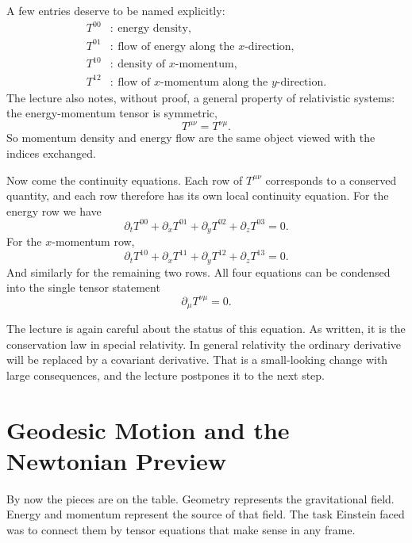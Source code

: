 A few entries deserve to be named explicitly:
\begin{align}
T^{00} &:\ \text{energy density}, \\
T^{01} &:\ \text{flow of energy along the }x\text{-direction}, \\
T^{10} &:\ \text{density of }x\text{-momentum}, \\
T^{12} &:\ \text{flow of }x\text{-momentum along the }y\text{-direction}.
\end{align}
The lecture also notes, without proof, a general property of relativistic systems: the energy-momentum tensor is symmetric,
\begin{equation}
T^{\mu\nu}=T^{\nu\mu}.
\end{equation}
So momentum density and energy flow are the same object viewed with the indices exchanged.

Now come the continuity equations. Each row of \(T^{\mu\nu}\) corresponds to a conserved quantity, and each row therefore has its own local continuity equation. For the energy row we have
\begin{equation}
\partial_t T^{00}+\partial_x T^{01}+\partial_y T^{02}+\partial_z T^{03}=0.
\end{equation}
For the \(x\)-momentum row,
\begin{equation}
\partial_t T^{10}+\partial_x T^{11}+\partial_y T^{12}+\partial_z T^{13}=0.
\end{equation}
And similarly for the remaining two rows. All four equations can be condensed into the single tensor statement
\begin{equation}
\partial_\mu T^{\nu\mu}=0.
\end{equation}

The lecture is again careful about the status of this equation. As written, it is the conservation law in special relativity. In general relativity the ordinary derivative will be replaced by a covariant derivative. That is a small-looking change with large consequences, and the lecture postpones it to the next step.

\section{Geodesic Motion and the Newtonian Preview}

By now the pieces are on the table. Geometry represents the gravitational field. Energy and momentum represent the source of that field. The task Einstein faced was to connect them by tensor equations that make sense in any frame.

